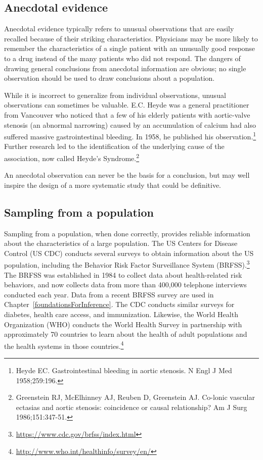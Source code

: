 \textD{\newpage}


\subsection{Anecdotal evidence}
\label{anecdotalEvidence}

Anecdotal evidence typically refers to unusual observations that are easily recalled because of their striking characteristics. Physicians may be more likely to remember the characteristics of a single patient with an unusually good response to a drug instead of the many patients who did not respond.  The dangers of drawing general conclusions from anecdotal information are obvious; no single observation should be used to draw conclusions about a population.

While it is incorrect to generalize from individual observations, unusual observations can sometimes be valuable.  E.C. Heyde was a general practitioner from Vancouver who noticed that a few of his elderly patients with aortic-valve stenosis (an abnormal narrowing) caused by an accumulation of calcium had also suffered massive gastrointestinal bleeding. In 1958, he published his observation.\footnote{Heyde EC. Gastrointestinal bleeding in aortic stenosis. N Engl J Med 1958;259:196.} Further research led to the identification of the underlying cause of the association, now called Heyde's Syndrome.\footnote{Greenstein RJ, McElhinney AJ, Reuben D, Greenstein AJ. Co-lonic vascular ectasias and aortic stenosis: coincidence or causal relationship? Am J Surg 1986;151:347-51.}

An anecdotal observation can never be the basis for a conclusion, but may well inspire the design of a more systematic study that could be definitive.  


\textD{\newpage}


\subsection{Sampling from a population}

Sampling from a population, when done correctly, provides reliable information about the characteristics of a large population. The US Centers for Disease Control (US CDC) conducts several surveys to obtain information about the US population, including the Behavior Risk Factor Surveillance System (BRFSS).\footnote{\url{https://www.cdc.gov/brfss/index.html}} The BRFSS was established in 1984 to collect data about health-related risk behaviors, and now collects data from more than 400,000 telephone interviews conducted each year. Data from a recent BRFSS survey are used in Chapter~\ref{foundationsForInference}. The CDC conducts similar surveys for diabetes, health care access, and immunization. Likewise, the World Health Organization (WHO) conducts the World Health Survey in partnership  with approximately 70 countries to learn about the health of adult populations and the health systems in those countries.\footnote{\url{http://www.who.int/healthinfo/survey/en/}}  

